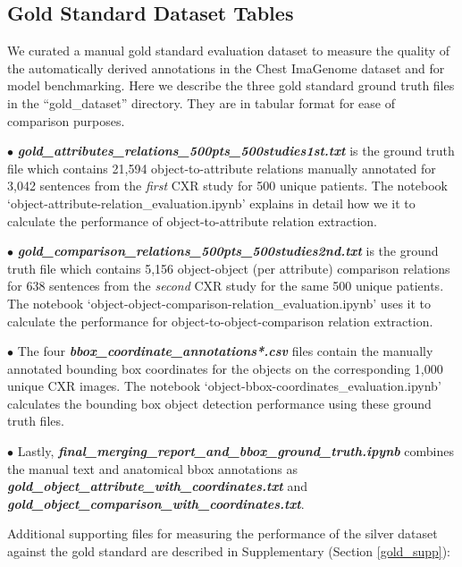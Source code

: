 \vspace{-5pt}
\subsection*{Gold Standard Dataset Tables}
\vspace{-2pt}
We curated a manual gold standard evaluation dataset to measure the quality of the automatically derived annotations in the Chest ImaGenome dataset and for model benchmarking. Here we describe the three gold standard ground truth files in the ``gold\_dataset'' directory. They are in tabular format for ease of comparison purposes.

$\bullet$  \textit{\textbf{gold\_attributes\_relations\_500pts\_500studies1st.txt}} is the ground truth file which contains 21,594 object-to-attribute relations manually annotated for 3,042 sentences from the \textit{first} CXR study for 500 unique patients. The notebook `object-attribute-relation\_evaluation.ipynb' explains in detail how we it to calculate the performance of object-to-attribute relation extraction.

$\bullet$  \textit{\textbf{gold\_comparison\_relations\_500pts\_500studies2nd.txt}} is the ground truth file which contains 5,156 object-object (per attribute) comparison relations for 638 sentences from the \textit{second} CXR study for the same 500 unique patients. The notebook `object-object-comparison-relation\_evaluation.ipynb' uses it to calculate the performance for object-to-object-comparison relation extraction.

$\bullet$  The four \textit{\textbf{bbox\_coordinate\_annotations*.csv}} files contain the manually annotated bounding box coordinates for the objects on the corresponding 1,000 unique CXR images. The notebook `object-bbox-coordinates\_evaluation.ipynb' calculates the bounding box object detection performance using these ground truth files.

$\bullet$ Lastly, \textit{\textbf{final\_merging\_report\_and\_bbox\_ground\_truth.ipynb}} combines the manual text and anatomical bbox annotations as \textit{\textbf{gold\_object\_attribute\_with\_coordinates.txt}} and \textit{\textbf{gold\_object\_comparison\_with\_coordinates.txt}}.

Additional supporting files for measuring the performance of the silver dataset against the gold standard are described in Supplementary (Section \ref{gold_supp}):


